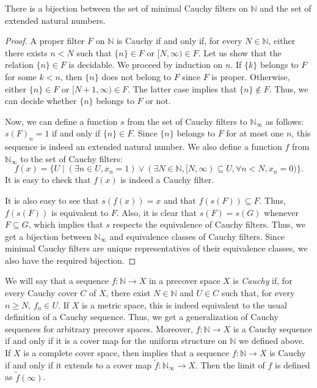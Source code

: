 \documentclass[reqno]{amsart}
\theoremstyle{definition}
\theoremstyle{remark}
\numberwithin{figure}{section}
\begin{document}
\begin{prop}
There is a bijection between the set of minimal Cauchy filters on $\mathbb{N}$ and the set of extended natural numbers.
\end{prop}
\begin{proof}
A proper filter $F$ on $\mathbb{N}$ is Cauchy if and only if, for every $N \in \mathbb{N}$, either there exists $n < N$ such that $\{ n \} \in F$ or $[N,\infty) \in F$.
Let us show that the relation $\{ n \} \in F$ is decidable.
We proceed by induction on $n$.
If $\{ k \}$ belongs to $F$ for some $k < n$, then $\{ n \}$ does not belong to $F$ since $F$ is proper.
Otherwise, either $\{ n \} \in F$ or $[N + 1, \infty) \in F$.
The latter case implies that $\{ n \} \notin F$.
Thus, we can decide whether $\{ n \}$ belongs to $F$ or not.

Now, we can define a function $s$ from the set of Cauchy filters to $\mathbb{N}_\infty$ as follows: $s(F)_n = 1$ if and only if $\{ n \} \in F$.
Since $\{ n \}$ belongs to $F$ for at most one $n$, this sequence is indeed an extended natural number.
We also define a function $f$ from $\mathbb{N}_\infty$ to the set of Cauchy filters:
\[ f(x) = \{ U \mid (\exists n \in U, x_n = 1) \lor (\exists N \in \mathbb{N}, [N,\infty) \subseteq U, \forall n < N, x_n = 0) \}. \]
It is easy to check that $f(x)$ is indeed a Cauchy filter.

It is also easy to see that $s(f(x)) = x$ and that $f(s(F)) \subseteq F$.
Thus, $f(s(F))$ is equivalent to $F$.
Also, it is clear that $s(F) = s(G)$ whenever $F \subseteq G$, which implies that $s$ respects the equivalence of Cauchy filters.
Thus, we get a bijection between $\mathbb{N}_\infty$ and equivalence classes of Cauchy filters.
Since minimal Cauchy filters are unique representatives of their equivalence classes, we also have the required bijection.
\end{proof}

We will say that a sequence $f : \mathbb{N} \to X$ in a precover space $X$ is \emph{Cauchy} if, for every Cauchy cover $C$ of $X$, there exist $N \in \mathbb{N}$ and $U \in C$ such that, for every $n \geq N$, $f_n \in U$.
If $X$ is a metric space, this is indeed equivalent to the usual definition of a Cauchy sequence.
Thus, we get a generalization of Cauchy sequences for arbitrary precover spaces.
Moreover, $f : \mathbb{N} \to X$ is a Cauchy sequence if and only if it is a cover map for the uniform structure on $\mathbb{N}$ we defined above.
If $X$ is a complete cover space, then  implies that a sequence $f : \mathbb{N} \to X$ is Cauchy if and only if it extends to a cover map $\widetilde{f} : \mathbb{N}_\infty \to X$.
Then the limit of $f$ is defined as $\widetilde{f}(\infty)$.
\end{document}
